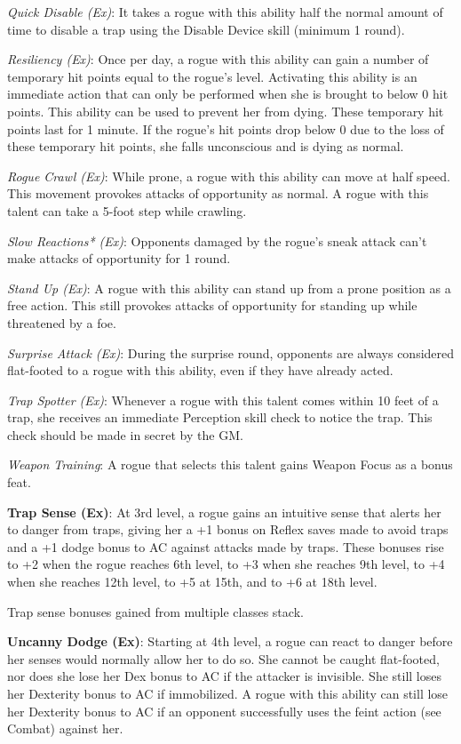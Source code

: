 \textit{Quick Disable (Ex)}: It takes a rogue with this ability half the normal amount of time to disable a trap using the Disable Device skill (minimum 1 round).
				
\textit{Resiliency (Ex)}: Once per day, a rogue with this ability can gain a number of temporary hit points equal to the rogue's level. Activating this ability is an immediate action that can only be performed when she is brought to below 0 hit points. This ability can be used to prevent her from dying. These temporary hit points last for 1 minute. If the rogue's hit points drop below 0 due to the loss of these temporary hit points, she falls unconscious and is dying as normal.
				
\textit{Rogue Crawl (Ex)}: While prone, a rogue with this ability can move at half speed. This movement provokes attacks of opportunity as normal. A rogue with this talent can take a 5-foot step while crawling.
				
\textit{Slow Reactions* (Ex)}: Opponents damaged by the rogue's sneak attack can't make attacks of opportunity for 1 round.
				
\textit{Stand Up (Ex)}: A rogue with this ability can stand up from a prone position as a free action. This still provokes attacks of opportunity for standing up while threatened by a foe.
				
\textit{Surprise Attack (Ex)}: During the surprise round, opponents are always considered flat-footed to a rogue with this ability, even if they have already acted. 
				
\textit{Trap Spotter (Ex)}: Whenever a rogue with this talent comes within 10 feet of a trap, she receives an immediate Perception skill check to notice the trap. This check should be made in secret by the GM.
				
\textit{Weapon Training}: A rogue that selects this talent gains Weapon Focus as a bonus feat.
				
\textbf{Trap Sense (Ex)}: At 3rd level, a rogue gains an intuitive sense that alerts her to danger from traps, giving her a +1 bonus on Reflex saves made to avoid traps and a +1 dodge bonus to AC against attacks made by traps. These bonuses rise to +2 when the rogue reaches 6th level, to +3 when she reaches 9th level, to +4 when she reaches 12th level, to +5 at 15th, and to +6 at 18th level.
				
Trap sense bonuses gained from multiple classes stack.
				
\textbf{Uncanny Dodge (Ex)}: Starting at 4th level, a rogue can react to danger before her senses would normally allow her to do so. She cannot be caught flat-footed, nor does she lose her Dex bonus to AC if the attacker is invisible. She still loses her Dexterity bonus to AC if immobilized. A rogue with this ability can still lose her Dexterity bonus to AC if an opponent successfully uses the feint action (see Combat) against her.
				
